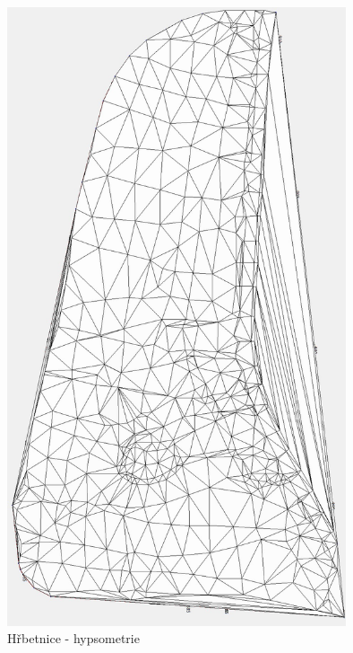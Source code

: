 \documentclass[a4paper, 12pt]{article}
\begin{document}
\clearpage
\begin{figure}[h]
	\centering
	\includegraphics[width=10cm]{dmt_nas.jpg}
	\caption{Hřbetnice - hypsometrie}
\end{figure}
\end{document}
